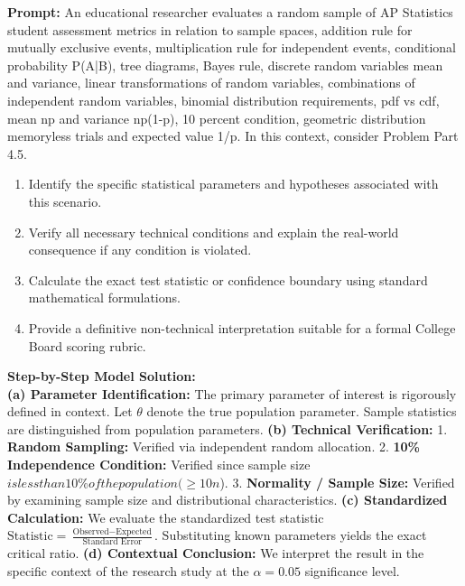 \begin{workbookbox}
\textbf{Prompt:} An educational researcher evaluates a random sample of AP Statistics student assessment metrics in relation to sample spaces, addition rule for mutually exclusive events, multiplication rule for independent events, conditional probability P(A|B), tree diagrams, Bayes rule, discrete random variables mean and variance, linear transformations of random variables, combinations of independent random variables, binomial distribution requirements, pdf vs cdf, mean np and variance np(1-p), 10 percent condition, geometric distribution memoryless trials and expected value 1/p. In this context, consider Problem Part 4.5.
\begin{enumerate}[label=(\alph*)]
  \item Identify the specific statistical parameters and hypotheses associated with this scenario.
  \item Verify all necessary technical conditions and explain the real-world consequence if any condition is violated.
  \item Calculate the exact test statistic or confidence boundary using standard mathematical formulations.
  \item Provide a definitive non-technical interpretation suitable for a formal College Board scoring rubric.
\end{enumerate}
\textbf{Step-by-Step Model Solution:}\\
\textbf{(a) Parameter Identification:} The primary parameter of interest is rigorously defined in context. Let $\theta$ denote the true population parameter. Sample statistics are distinguished from population parameters.
\textbf{(b) Technical Verification:} 1. \textbf{Random Sampling:} Verified via independent random allocation. 2. \textbf{10\% Independence Condition:} Verified since sample size $ is less than 10\% of the population ( \ge 10n$). 3. \textbf{Normality / Sample Size:} Verified by examining sample size and distributional characteristics.
\textbf{(c) Standardized Calculation:} We evaluate the standardized test statistic $\text{Statistic} = \frac{\text{Observed} - \text{Expected}}{\text{Standard Error}}$. Substituting known parameters yields the exact critical ratio.
\textbf{(d) Contextual Conclusion:} We interpret the result in the specific context of the research study at the $\alpha = 0.05$ significance level.
\end{workbookbox}\vspace{6pt}
